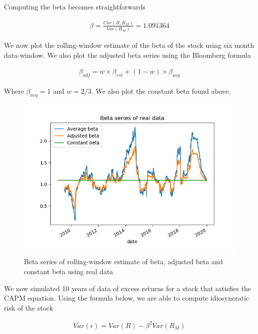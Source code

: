 \documentclass[10pt]{article}
\newenvironment{exercise}[2][Exercise]{\begin{trivlist}
  \item[\hskip \labelsep {\bfseries #1}\hskip \labelsep {\bfseries #2.}]}{\end{trivlist}}
\begin{document}
\begin{exercise}{2}
	\smallbreak
	
	Computing the beta becomes straightforwards
	
	\begin{align*}
		\beta = \frac{Cov(R, R_{M})}{Var(R_{M})} = 1.091364
	\end{align*}

	We now plot the rolling-window estimate of the beta of the stock using six month data-window. We also plot the adjusted beta series using the Bloomberg formula 
	
	\begin{align*}
		\beta_{adj} = w \times \beta_{est} + (1 - w) \times \beta_{avg}
	\end{align*}
	
	Where $\beta_{avg} = 1 $ and $w = 2/3$. We also plot the constant beta found above.
	
	\begin{figure}[H]
	
		\centering
		\includegraphics[scale=0.8]{figures/ex2_2.png}	
		\caption{Beta series of rolling-window estimate of beta, adjusted beta and constant beta using real data}	
		\label{fig:ex2_2}
				
	\end{figure}	

	We now simulated 10 years of data of excess returns for a stock that satisfies the CAPM equation. Using the formula below, we are able to compute idiosyncratic risk of the stock
	
	\begin{align*}
		Var(\epsilon) = Var(R) - \beta^{2} Var(R_{M})
	\end{align*}
	

\end{exercise}
\end{document}
